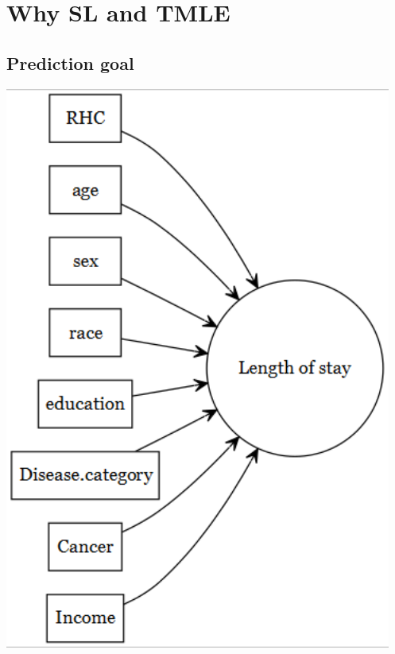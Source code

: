\documentclass[
]{book}
\begin{document}
\hypertarget{why-sl-and-tmle}{%
\section{Why SL and TMLE}\label{why-sl-and-tmle}}

\hypertarget{prediction-goal}{%
\subsection{Prediction goal}\label{prediction-goal}}

\includegraphics[width=5.01in]{images/dagpred}
\end{document}
